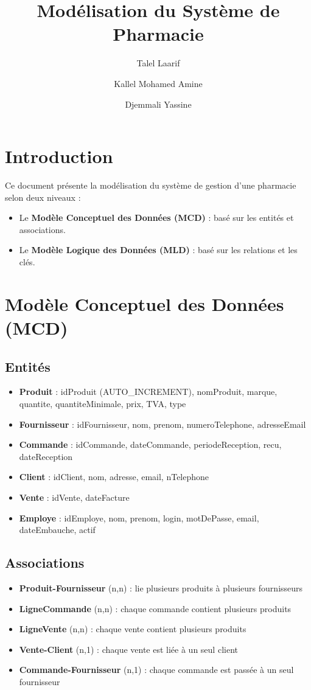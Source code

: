 \documentclass[12pt]{article}
\author{
  Talel Laarif
  \and
Kallel Mohamed Amine
  \and
  Djemmali Yassine
}
\title{\textbf{Modélisation du Système de Pharmacie}}
\begin{document}
\maketitle

\section*{Introduction}
Ce document présente la modélisation du système de gestion d'une pharmacie selon deux niveaux :
\begin{itemize}
  \item Le \textbf{Modèle Conceptuel des Données (MCD)} : basé sur les entités et associations.
  \item Le \textbf{Modèle Logique des Données (MLD)} : basé sur les relations et les clés.
\end{itemize}

\section{Modèle Conceptuel des Données (MCD)}

\subsection*{Entités}
\begin{itemize}
  \item \textbf{Produit} : idProduit (AUTO\_INCREMENT), nomProduit, marque, quantite, quantiteMinimale, prix, TVA, type
  \item \textbf{Fournisseur} : idFournisseur, nom, prenom, numeroTelephone, adresseEmail
  \item \textbf{Commande} : idCommande, dateCommande, periodeReception, recu, dateReception
  \item \textbf{Client} : idClient, nom, adresse, email, nTelephone
  \item \textbf{Vente} : idVente, dateFacture
  \item \textbf{Employe} : idEmploye, nom, prenom, login, motDePasse, email, dateEmbauche, actif
\end{itemize}

\subsection*{Associations}
\begin{itemize}
  \item \textbf{Produit-Fournisseur} (n,n) : lie plusieurs produits à plusieurs fournisseurs
  \item \textbf{LigneCommande} (n,n) : chaque commande contient plusieurs produits
  \item \textbf{LigneVente} (n,n) : chaque vente contient plusieurs produits
  \item \textbf{Vente-Client} (n,1) : chaque vente est liée à un seul client
  \item \textbf{Commande-Fournisseur} (n,1) : chaque commande est passée à un seul fournisseur

\end{itemize}
\end{document}
